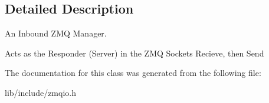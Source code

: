 \subsection{Detailed Description}
An Inbound Z\-M\-Q Manager. 

Acts as the Responder (Server) in the Z\-M\-Q Sockets Recieve, then Send 

The documentation for this class was generated from the following file\-:\begin{DoxyCompactItemize}
\item 
lib/include/zmqio.\-h\end{DoxyCompactItemize}
